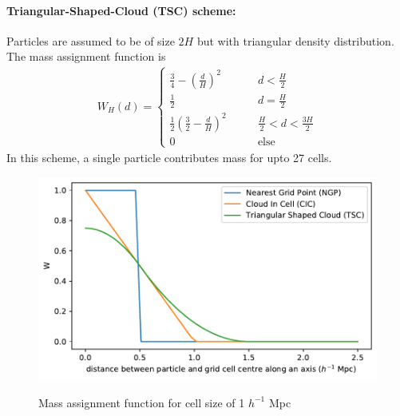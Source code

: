 \documentclass[12pt]{article}
\begin{document}
\paragraph{Triangular-Shaped-Cloud (TSC) scheme:}
Particles are assumed to be of size $2H$ but with triangular density distribution. The mass assignment function is
\begin{align}
W_{H}(d) = \begin{cases} \displaystyle
\frac{3}{4}- \left( \frac{d}{H} \right) ^2 &\qquad d < \frac{H}{2}\\ \displaystyle
\frac{1}{2} &\qquad d = \frac{H}{2}\\ \displaystyle
\frac{1}{2} \left( \frac{3}{2} - \frac{d}{H} \right) ^2 &\qquad \frac{H}{2} < d < \frac{3H}{2}\\ \displaystyle
0 &\qquad \text{else}
\end{cases}
\end{align}
In this scheme, a single particle contributes mass for upto 27 cells.


\begin{figure}[H]
	\centering
	\caption{Mass assignment function for cell size of 1 $h^{-1}$ Mpc}
	\includegraphics[width=0.7\linewidth]{../density_assign/density-assignment_functions}
	\label{fig:density-assignmentfunctions}
\end{figure}

%
\end{document}
